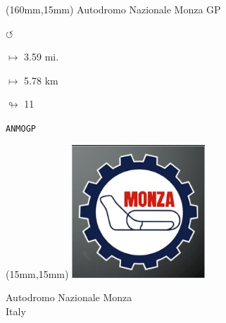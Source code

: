 \begin{textblock*}{40mm}(160mm,15mm)%
Autodromo Nazionale Monza GP
\par \Huge$\circlearrowleft$
\Large
\par$\mapsto$ 3.59 mi.
\par$\mapsto$ 5.78 km
\par$\looparrowright$ 11
\par\hfill\tiny\tt ANMOGP\\
\end{textblock*}
\null\newpage

\begin{textblock*}{50mm}(15mm,15mm)%
\includegraphics[width=50mm]{LG/2015-05-20_00086.png}
\par Autodromo Nazionale Monza\\ Italy
\end{textblock*}
